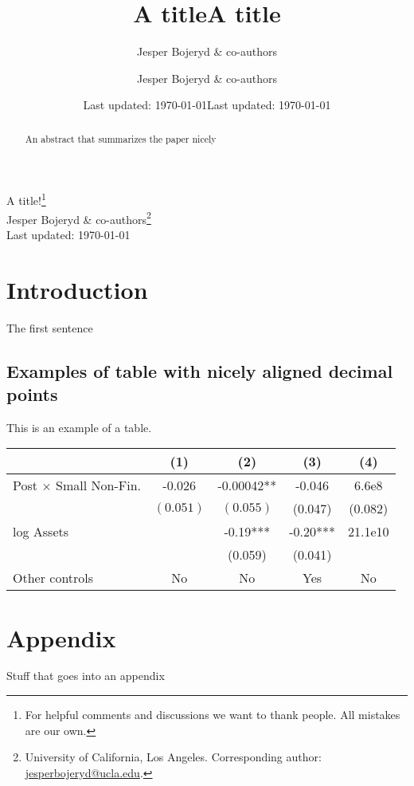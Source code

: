 \documentclass[12pt,letter]{article}
\title{A title}
\date{Last updated: \today}
\author{Jesper Bojeryd \& co-authors}
\title{A title}
\date{Last updated: \today}
\author{Jesper Bojeryd \& co-authors}
\begin{document}
 
\begingroup 
\renewcommand{\thefootnote}{\fnsymbol{footnote}}
  \centering 
  \LARGE A title!\footnote{For helpful comments and discussions we want to thank people. All mistakes are our own.} \\[0.2em]
  \large Jesper Bojeryd \& co-authors\footnote{University of California, Los Angeles. Corresponding author: \url{jesperbojeryd@ucla.edu}.}\\[0.5em]
  Last updated: \today
  \\[1em]\par
\endgroup

\setcounter{footnote}{0}%

\begin{abstract}
    \noindent An abstract that summarizes the paper nicely
\end{abstract}

\section{Introduction}
The first sentence

\subsection{Examples of table with nicely aligned decimal points}
This is an example of a table.

\begin{table}[h]\centering
{}
    \begin{tabular}{lS[table-format=-1.3]S[table-format=-1.5{**}]S[table-format=-1.2{***}]S[table-format=-2.3e2]}
    \hline
                        & {(1)} & {(2)} & {(3)} & {(4)} \\
    \hline
    {Post $\times$ Small Non-Fin.} & -0.026 & -0.00042** & -0.046 & 6.6e8 \\
                        & {$(0.051)$} & {$(0.055)$} & {(}0.047{) }& {(}0.082{)} \\
    {log Assets} & & -0.19***& -0.20***& 21.1e10\\
                        & & {(}0.059{)} & {(}0.041{)} &%
                        \\
    {Other controls} & {No} & {No} & {Yes} & {No} \\
    \hline
    \end{tabular}
\end{table}





\newpage\clearpage
\appendix 
\setcounter{figure}{0} \renewcommand{\thefigure}{A\arabic{figure}}
\setcounter{table}{0} \renewcommand{\thetable}{A\arabic{table}}

\section*{Appendix}
Stuff that goes into an appendix
\end{document}
